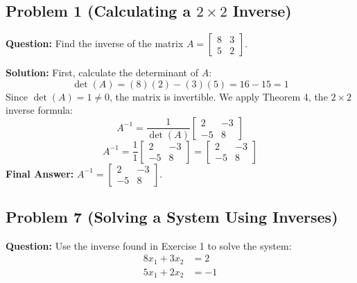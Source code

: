 \documentclass[12pt]{article}
\begin{document}
\subsection{Problem 1 (Calculating a $2 \times 2$ Inverse)}
\textbf{Question:} Find the inverse of the matrix $A = \begin{bmatrix} 8 & 3 \\ 5 & 2 \end{bmatrix}$.

\textbf{Solution:}
First, calculate the determinant of $A$:
\[ \det(A) = (8)(2) - (3)(5) = 16 - 15 = 1 \]
Since $\det(A) = 1 \neq 0$, the matrix is invertible.
We apply Theorem 4, the $2 \times 2$ inverse formula:
\[ A^{-1} = \frac{1}{\det(A)} \begin{bmatrix} 2 & -3 \\ -5 & 8 \end{bmatrix} \]
\[ A^{-1} = \frac{1}{1} \begin{bmatrix} 2 & -3 \\ -5 & 8 \end{bmatrix} = \begin{bmatrix} 2 & -3 \\ -5 & 8 \end{bmatrix} \]
\textbf{Final Answer:} $A^{-1} = \begin{bmatrix} 2 & -3 \\ -5 & 8 \end{bmatrix}$.

\subsection{Problem 7 (Solving a System Using Inverses)}
\textbf{Question:} Use the inverse found in Exercise 1 to solve the system:
\begin{align*}
8x_1 + 3x_2 &= 2 \\
5x_1 + 2x_2 &= -1
\end{align*}
\end{document}
